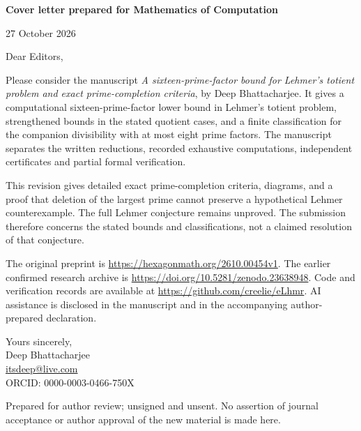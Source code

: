 \documentclass[11pt]{article}
\begin{document}
\textbf{Cover letter prepared for Mathematics of Computation}

27 October 2026

Dear Editors,

Please consider the manuscript \emph{A sixteen-prime-factor bound for Lehmer's totient problem and exact prime-completion criteria}, by Deep Bhattacharjee.
It gives a computational sixteen-prime-factor lower bound in Lehmer's
totient problem, strengthened bounds in the stated quotient cases,
and a finite classification for the companion divisibility with at most
eight prime factors. The manuscript separates the written reductions,
recorded exhaustive computations, independent certificates and partial
formal verification.

This revision gives detailed exact prime-completion criteria, diagrams,
and a proof that deletion of the largest prime cannot preserve a
hypothetical Lehmer counterexample. The full Lehmer conjecture remains
unproved. The submission therefore concerns the stated bounds and
classifications, not a claimed resolution of that conjecture.

The original preprint is
\url{https://hexagonmath.org/2610.00454v1}. The earlier confirmed research
archive is \url{https://doi.org/10.5281/zenodo.23638948}. Code and
verification records are available at \url{https://github.com/creelie/eLhmr}.
AI assistance is disclosed in the manuscript and in the accompanying
author-prepared declaration.

Yours sincerely,\\
Deep Bhattacharjee\\
\href{mailto:itsdeep@live.com}{itsdeep@live.com}\\
ORCID: 0000-0003-0466-750X

\vfill
{\small Prepared for author review; unsigned and unsent. No assertion
of journal acceptance or author approval of the new material is made here.}
\end{document}
